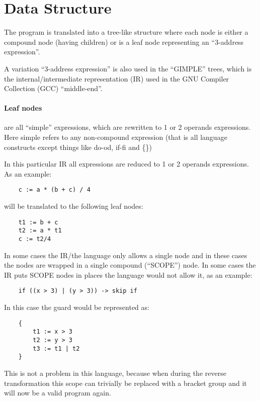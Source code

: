 
\section{Data Structure}

The program is translated into a tree-like structure where each node
is either a compound node (having children) or is a leaf node representing
an ``3-address expression''.

  A variation ``3-address expression'' is also used in the ``GIMPLE'' trees,
which is the internal/intermediate representation (IR) used in the GNU Compiler
Collection (GCC) ``middle-end''.

\paragraph*{Leaf nodes}
are all ``simple'' expressions, which are rewritten to 1 or 2 operands expressions. Here
simple refers to any non-compound expression (that is all language constructs
except things like do-od, if-fi and \{\})

In this particular IR all expressions are reduced to 1 or 2 operands expressions.
As an example:

\begin{lstlisting}
	c := a * (b + c) / 4
\end{lstlisting}
	
will be translated to the following leaf nodes:

\begin{lstlisting}
	t1 := b + c
	t2 := a * t1
	c := t2/4
\end{lstlisting}
	
In some cases the IR/the language only allows a single node and in these cases
the nodes are wrapped in a single compound (``SCOPE'') node. In some cases the
IR puts SCOPE nodes in places the language would not allow it, as an example:

\begin{lstlisting}
	if ((x > 3) | (y > 3)) -> skip if
\end{lstlisting}

In this case the guard would be represented as:

\begin{lstlisting}
	{
		t1 := x > 3
		t2 := y > 3
		t3 := t1 | t2
	}
\end{lstlisting}

This is not a problem in this language, because when during the reverse transformation
this scope can trivially be replaced with a bracket group and it will now be a valid
program again.

